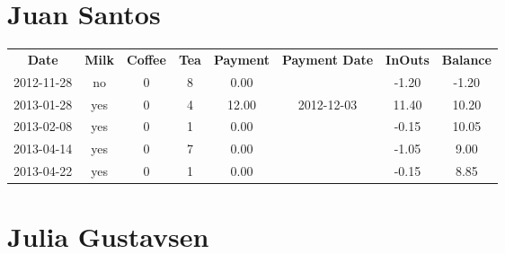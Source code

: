 \section{Juan Santos}

\begin{center}
\begin{tabular}{cccccccc}
\textbf{Date} & \textbf{Milk} & \textbf{Coffee} & \textbf{Tea} & \textbf{Payment} & \textbf{Payment Date} & \textbf{InOuts} & \textbf{Balance} \\
2012-11-28 & no & 0 & 8 &  0.00 &  & -1.20 & -1.20\\ 
2013-01-28 & yes & 0 & 4 & 12.00 & 2012-12-03 & 11.40 & 10.20\\ 
2013-02-08 & yes & 0 & 1 &  0.00 &  & -0.15 & 10.05\\ 
2013-04-14 & yes & 0 & 7 &  0.00 &  & -1.05 &  9.00\\ 
2013-04-22 & yes & 0 & 1 &  0.00 &  & -0.15 &  8.85
\end{tabular}
\end{center}

\section{Julia Gustavsen}

